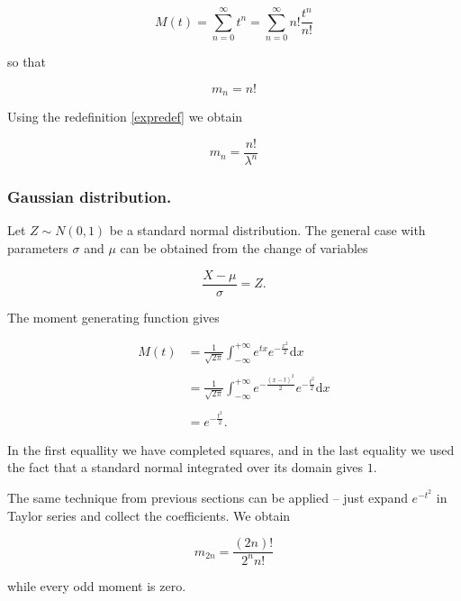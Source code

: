 \documentclass[12pt]{article}
\begin{document}
\begin{equation}
M(t) = \sum_{n=0}^{\infty} t^{n} = 
\sum_{n=0}^{\infty} n! \frac{t^{n}}{n!}
\end{equation}

\noindent
so that

\begin{equation}
m_{n} = n!
\end{equation}

Using the redefinition \eqref{expredef} we obtain

\begin{equation}
m_{n} = \frac{n!}{\lambda^{n}}
\end{equation}

\subsubsection{Gaussian distribution.}

Let $Z \sim N(0,1)$ be a standard normal distribution.
The general case with parameters $\sigma$ and $\mu$ can be obtained 
from the change of variables

\begin{equation}
\frac{X - \mu}{\sigma} = Z.
\end{equation}

The moment generating function gives

\begin{align}
M(t) &= \frac{1}{ \sqrt{2 \pi } } \int_{-\infty}^{+\infty}
e^{t x} e^{-\frac{x^{2}}{2}} \mathrm{d} x
\nonumber \\
\nonumber \\
&= \frac{1}{ \sqrt{2 \pi } } \int_{-\infty}^{+\infty}
e^{- \frac{(x - t)^{2}}{2}} e^{-\frac{t^{2}}{2}} \mathrm{d} x 
\nonumber \\
\nonumber \\
&= e^{- \frac{t^{2}}{2} }.
\end{align}

\noindent
In the first equallity we have completed squares, and in the last equality
we used the fact that a standard normal integrated over its domain gives $1$.

The same technique from previous sections can be applied -- just expand $e^{-t^{2}}$ in
Taylor series and collect the coefficients. We obtain

\begin{equation}
m_{2n} = \frac{(2n)!}{2^{n} n !}
\end{equation}

\noindent
while every odd moment is zero.
\end{document}

